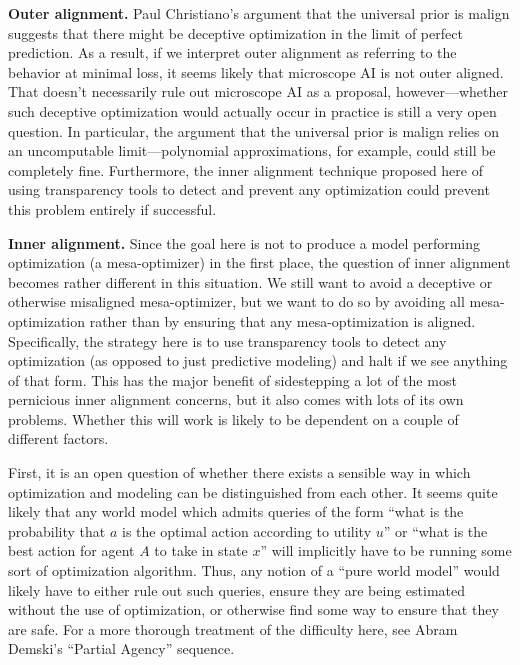 \textbf{Outer alignment.} Paul Christiano's argument that the universal prior is malign\cite{TODO: cite https://ordinaryideas.wordpress.com/2016/11/30/what-does-the-universal-prior-actually-look-like} suggests that there might be deceptive optimization in the limit of perfect prediction. As a result, if we interpret outer alignment as referring to the behavior at minimal loss\cite{TODO: cite https://www.alignmentforum.org/posts/33EKjmAdKFn3pbKPJ/outer-alignment-and-imitative-amplification}, it seems likely that microscope AI is not outer aligned. That doesn't necessarily rule out microscope AI as a proposal, however---whether such deceptive optimization would actually occur in practice is still a very open question. In particular, the argument that the universal prior is malign relies on an uncomputable limit---polynomial approximations, for example, could still be completely fine. Furthermore, the inner alignment technique proposed here of using transparency tools to detect and prevent any optimization could prevent this problem entirely if successful.

\textbf{Inner alignment.} Since the goal here is not to produce a model performing optimization (a mesa-optimizer) in the first place, the question of inner alignment becomes rather different in this situation. We still want to avoid a deceptive or otherwise misaligned mesa-optimizer, but we want to do so by avoiding all mesa-optimization rather than by ensuring that any mesa-optimization is aligned. Specifically, the strategy here is to use transparency tools to detect any optimization (as opposed to just predictive modeling) and halt if we see anything of that form. This has the major benefit of sidestepping a lot of the most pernicious inner alignment concerns, but it also comes with lots of its own problems. Whether this will work is likely to be dependent on a couple of different factors.

First, it is an open question of whether there exists a sensible way in which optimization and modeling can be distinguished from each other. It seems quite likely that any world model which admits queries of the form ``what is the probability that $a$ is the optimal action according to utility $u$'' or ``what is the best action for agent $A$ to take in state $x$'' will implicitly have to be running some sort of optimization algorithm. Thus, any notion of a ``pure world model'' would likely have to either rule out such queries, ensure they are being estimated without the use of optimization, or otherwise find some way to ensure that they are safe. For a more thorough treatment of the difficulty here, see Abram Demski's ``Partial Agency\cite{TODO: cite https://www.alignmentforum.org/s/HeYtBkNbEe7wpjc6X}'' sequence.

